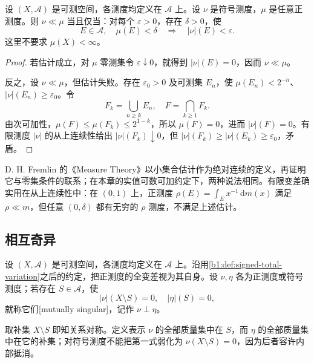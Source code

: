\begin{proposition}\label{b1:prop:measure-ac-epsilon-delta}
设 \((X,\mathcal A)\) 是可测空间，各测度均定义在 \(\mathcal A\) 上。设 \(\nu\) 是符号测度，\(\mu\) 是任意正测度。则 \(\nu\ll\mu\) 当且仅当：对每个 \(\varepsilon>0\)，存在 \(\delta>0\)，使
\[
E\in\mathcal A,\quad\mu(E)<\delta
\quad\Longrightarrow\quad |\nu|(E)<\varepsilon.
\]
这里不要求 \(\mu(X)<\infty\)。
\end{proposition}
\begin{proof}
若估计成立，对 \(\mu\) 零测集令 \(\varepsilon\downarrow0\)，就得到 \(|\nu|(E)=0\)，因而 \(\nu\ll\mu\)。

反之，设 \(\nu\ll\mu\)，但估计失败。存在 \(\varepsilon_0>0\) 及可测集 \(E_n\)，使 \(\mu(E_n)<2^{-n}\)、\(|\nu|(E_n)\geq\varepsilon_0\)。令
\[
F_k=\bigcup_{n\geq k}E_n,\quad F=\bigcap_{k\geq1}F_k.
\]
由次可加性，\(\mu(F)\leq\mu(F_k)\leq2^{1-k}\)，所以 \(\mu(F)=0\)，进而 \(|\nu|(F)=0\)。有限测度 \(|\nu|\) 的从上连续性给出 \(|\nu|(F_k)\downarrow0\)，但 \(|\nu|(F_k)\geq|\nu|(E_k)\geq\varepsilon_0\)，矛盾。
\end{proof}

D. H. Fremlin 的《Measure Theory》\cite[\S232]{Fremlin2016Measure}以小集合估计作为绝对连续的定义，再证明它与零集条件的联系；在本章的实值可数可加约定下，两种说法相同。有限变差确实用在从上连续性中：在 \((0,1)\) 上，正测度 \(\rho(E)=\int_E x^{-1}\,\mathrm dm(x)\) 满足 \(\rho\ll m\)，但任意 \((0,\delta)\) 都有无穷的 \(\rho\) 测度，不满足上述估计。

\subsection{相互奇异}
\label{b1:subsec:060302}

\begin{definition}\label{b1:def:mutually-singular-measures}
设 \((X,\mathcal A)\) 是可测空间，各测度均定义在 \(\mathcal A\) 上。沿用\cref{b1:def:signed-total-variation}之后的约定，把正测度的全变差视为其自身。设 \(\nu,\eta\) 各为正测度或符号测度；若存在 \(S\in\mathcal A\)，使
\[
|\nu|(X\setminus S)=0,\quad |\eta|(S)=0,
\]
就称它们[mutually singular]，记作 \(\nu\perp\eta\)。
\end{definition}

取补集 \(X\setminus S\) 即知关系对称。定义表示 \(\nu\) 的全部质量集中在 \(S\)，而 \(\eta\) 的全部质量集中在它的补集；对符号测度不能把第一式弱化为 \(\nu(X\setminus S)=0\)，因为后者容许内部抵消。

